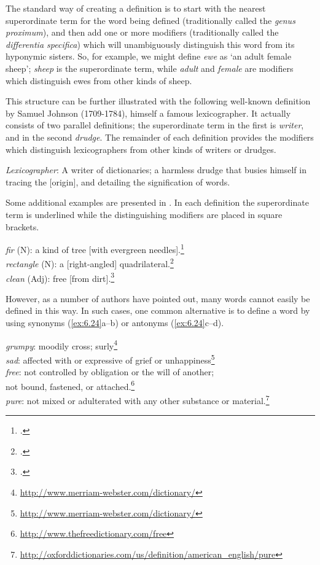 The standard way of creating a definition is to start with the nearest superordinate term for the word being defined (traditionally called the \textit{genus proximum}), and then add one or more modifiers (traditionally called the \textit{differentia specifica}) which will unambiguously distinguish this word from its hyponymic sisters. So, for example, we might define \textit{ewe} as ‘an adult female sheep’; \textit{sheep} is the superordinate term, while \textit{adult} and \textit{female} are modifiers which distinguish ewes from other kinds of sheep.



This structure can be further illustrated with the following well-known definition by Samuel Johnson (1709-1784), himself a famous lexicographer. It actually consists of two parallel definitions; the superordinate term in the first is \textit{writer}, and in the second \textit{drudge}. The remainder of each definition provides the modifiers which distinguish lexicographers from other kinds of writers or drudges.


\ea \label{ex:6.22}
\textit{Lexicographer}: A writer of dictionaries; a harmless drudge that busies himself in tracing the [origin], and detailing the signification of words.
\z


Some additional examples are presented in . In each definition the superordinate term is underlined while the distinguishing modifiers are placed in square brackets.


\ea \label{ex:6.23}
\ea \textit{fir} (N): a kind of tree [with evergreen needles].\footnote{\citet[62]{HartmannJames1998}.}\\
\ex \textit{rectangle} (N): a [right-angled] quadrilateral.\footnote{\citet[219]{Svensén2009}.}\\
\ex \textit{clean} (Adj): free [from dirt].\footnote{\citet[219]{Svensén2009}.}
                       \z
\z


However, as a number of authors have pointed out, many words cannot easily be defined in this way. In such cases, one common alternative is to define a word by using synonyms (\ref{ex:6.24}a--b) or antonyms (\ref{ex:6.24}c--d).


\ea \label{ex:6.24}
\ea \textit{grumpy}: moodily cross; surly\footnote{\url{http://www.merriam-webster.com/dictionary/}}\\
\ex \textit{sad}: affected with or expressive of grief or unhappiness\footnote{\url{http://www.merriam-webster.com/dictionary/}}\\
\ex \textit{free}: not controlled by obligation or the will of another;\\
  not bound, fastened, or attached.\footnote{\url{http://www.thefreedictionary.com/free}} \\
\ex \textit{pure}: not mixed or adulterated with any other substance or material.\footnote{\url{http://oxforddictionaries.com/us/definition/american_english/pure}} 
                       \z
\z


